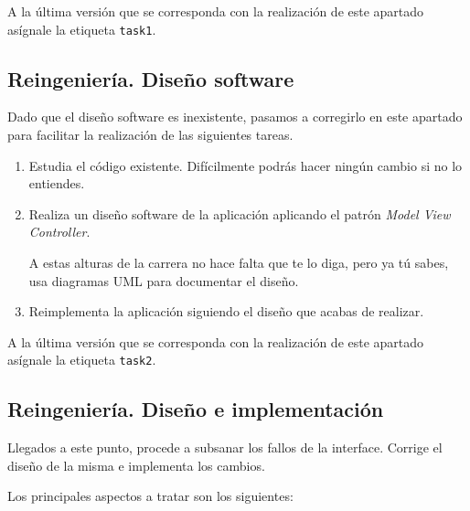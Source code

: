 \documentclass[11pt,a4paper]{article}
\begin{document}
A la última versión que se corresponda con la realización de este
apartado asígnale la etiqueta \texttt{task1}.

\subsection{Reingeniería. Diseño software}

Dado que el diseño software es inexistente, pasamos a corregirlo en
este apartado para facilitar la realización de las siguientes tareas.

\begin{enumerate}
\item Estudia el código existente. Difícilmente podrás hacer ningún
  cambio si no lo entiendes.

\item Realiza un diseño software de la aplicación aplicando el patrón
  \emph{Model View Controller}.

  A estas alturas de la carrera no hace falta que te lo diga, pero ya
  tú sabes, usa diagramas UML para documentar el diseño.

\item Reimplementa la aplicación siguiendo el diseño que acabas de realizar.
\end{enumerate}

A la última versión que se corresponda con la realización de este
apartado asígnale la etiqueta \texttt{task2}.

\subsection{Reingeniería. Diseño e implementación}

Llegados a este punto, procede a subsanar los fallos de la
interface. Corrige el diseño de la misma e implementa los cambios.

Los principales aspectos a tratar son los siguientes:
\end{document}
